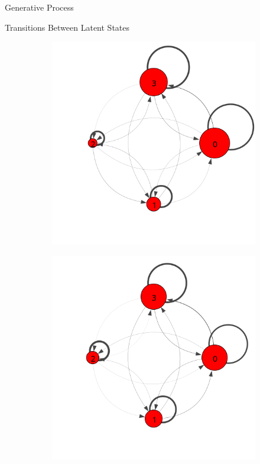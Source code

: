 \documentclass[final,t]{beamer}
\newcommand{\vsp}[0]{\vspace{0.21in}}
\begin{document}
\begin{frame}[fragile]
\begin{columns}[t]
\begin{column}{0.6\textwidth}
\begin{block}{Generative Process}
      \end{block}
      \vsp{}
      \begin{block}{Transitions Between Latent States}
        \begin{figure}
          \centering
          \begin{subfigure}[t]{0.32\textwidth}
            \includegraphics[width=\textwidth,trim={0 2cm 0 0cm}]{../../figures/trans-comp/trans-avg.png}
            \caption{\label{fig:trans-avg}}
          \end{subfigure}%
          \begin{subfigure}[t]{0.32\textwidth}
            \includegraphics[width=\textwidth,trim={0 2cm 0 0cm}]{../../figures/trans-comp/trans-perfect.png}

\end{subfigure}
\end{figure}
\end{block}
\end{column}
\end{columns}
\end{frame}
\end{document}
